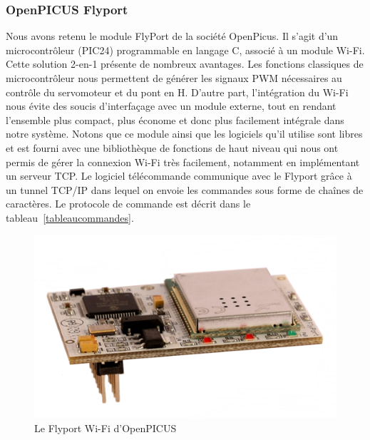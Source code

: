 \documentclass[a4paper,12pt]{report}
\begin{document}
			\subsubsection{OpenPICUS Flyport}
			Nous avons retenu le module FlyPort de la société OpenPicus. Il s’agit d’un microcontrôleur (PIC24) programmable en langage C, associé à un module Wi-Fi. Cette solution 2-en-1 présente de nombreux avantages. Les fonctions classiques de microcontrôleur nous permettent de générer les signaux PWM nécessaires au contrôle du servomoteur et du pont en H. D’autre part, l’intégration du Wi-Fi nous évite des soucis d’interfaçage avec un module externe, tout en rendant l’ensemble plus compact, plus économe et donc plus facilement intégrale dans notre système.
Notons que ce module ainsi que les logiciels qu’il utilise sont libres et est fourni avec une bibliothèque de fonctions de haut niveau qui nous ont permis de gérer la connexion Wi-Fi  très facilement, notamment en implémentant un serveur TCP. Le logiciel télécommande communique avec le Flyport grâce à un tunnel TCP/IP dans lequel on envoie les commandes sous forme de chaînes de caractères. Le protocole de commande est décrit dans le tableau~\ref{tableaucommandes}.

\begin{figure}[!h]
	\begin{center}
		\includegraphics[scale=0.3]{images/flyport.png}
	\end{center}
	\caption{Le Flyport Wi-Fi d'OpenPICUS} 
	\label{flyport}
\end{figure}
\end{document}
